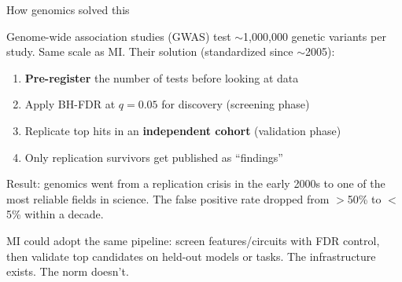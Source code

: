 \documentclass[aspectratio=169,11pt]{beamer}
\begin{document}
\begin{frame}{How genomics solved this}

{\small Genome-wide association studies (GWAS) test $\sim$1,000,000 genetic variants per study. Same scale as MI. Their solution (standardized since $\sim$2005):}

\vspace{0.3em}

\begin{enumerate}\setlength\itemsep{3pt}
  \item {\small \textbf{Pre-register} the number of tests before looking at data}
  \item {\small Apply BH-FDR at $q = 0.05$ for discovery (screening phase)}
  \item {\small Replicate top hits in an \textbf{independent cohort} (validation phase)}
  \item {\small Only replication survivors get published as ``findings''}
\end{enumerate}

\vspace{0.4em}

{\small Result: genomics went from a replication crisis in the early 2000s to one of the most reliable fields in science. The false positive rate dropped from $>$50\% to $<$5\% within a decade.}

\vspace{0.3em}

{\small MI could adopt the same pipeline: screen features/circuits with FDR control, then validate top candidates on held-out models or tasks. The infrastructure exists. The norm doesn't.}
\end{frame}
\end{document}
